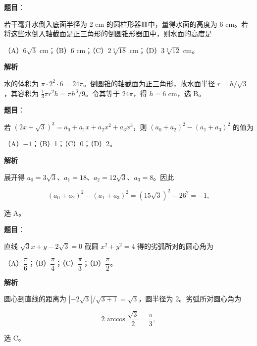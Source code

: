 \begin{answer}

\textbf{题目}：

若干毫升水倒入底面半径为 2 cm 的圆柱形器皿中，量得水面的高度为 6 cm。若将这些水倒入轴截面是正三角形的倒圆锥形器皿中，则水面的高度是

（A）$6\sqrt3$ cm；（B）6 cm；（C）$2\sqrt[3]{18}$ cm；（D）$3\sqrt[3]{12}$ cm。

\textbf{解析}

水的体积为 $\pi\cdot2^2\cdot6=24\pi$。倒圆锥的轴截面为正三角形，故水面半径 $r=h/\sqrt3$，其容积为 $\frac13\pi r^2h=\pi h^3/9$。令其等于 $24\pi$，得 $h=6$ cm，选 B。


\end{answer}
\begin{answer}

\textbf{题目}：

若 $(2x+\sqrt3)^3=a_0+a_1x+a_2x^2+a_3x^3$，则 $(a_0+a_2)^2-(a_1+a_3)^2$ 的值为

（A）$-1$；（B）1；（C）0；（D）2。

\textbf{解析}

展开得 $a_0=3\sqrt3$、$a_1=18$、$a_2=12\sqrt3$、$a_3=8$。因此

\nopagebreak[4]
\[
(a_0+a_2)^2-(a_1+a_3)^2=(15\sqrt3)^2-26^2=-1,
\]

选 A。


\end{answer}
\begin{answer}

\textbf{题目}：

直线 $\sqrt3x+y-2\sqrt3=0$ 截圆 $x^2+y^2=4$ 得的劣弧所对的圆心角为

（A）$\dfrac\pi6$；（B）$\dfrac\pi4$；（C）$\dfrac\pi3$；（D）$\dfrac\pi2$。

\textbf{解析}

圆心到直线的距离为 $|{-2\sqrt3}|/\sqrt{3+1}=\sqrt3$，圆半径为 2。劣弧所对圆心角为

\nopagebreak[4]
\[
2\arccos\frac{\sqrt3}{2}=\frac\pi3,
\]

选 C。


\end{answer}
